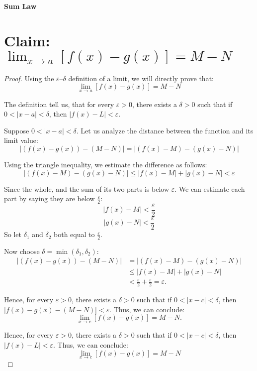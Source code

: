 \documentclass{article}
\begin{document}
	
\textbf{Sum Law}

\section*{Claim: $\lim_{x \to a} [f(x) - g(x)] = M - N$}


\begin{proof}

Using the $\varepsilon$–$\delta$ definition of a limit, we will directly prove that:
\[
\lim_{x \to a} [f(x) - g(x)] = M - N
\]

The definition tell us, that for every $\varepsilon > 0$, there exists a $\delta > 0$ such that if $0 < |x - a| < \delta$, then $|f(x) - L| < \varepsilon$.

Suppose $0 < |x - a| < \delta$. Let us analyze the distance between the function and its limit value:
\[
| (f(x) - g(x)) - (M - N) | = | (f(x) - M) - (g(x) - N) |
\]

Using the triangle inequality, we estimate the difference as follows:
\[
|(f(x) - M) - (g(x) - N)| \leq |f(x) - M| + |g(x) - N| < \varepsilon
\]


Since the whole, and the sum of its two parts is below $\varepsilon$. We can estimate each part by saying they are below $\frac{\varepsilon}{2}$:
\[
|f(x) - M| < \frac{\varepsilon}{2}
\]
\[
|g(x) - N| < \frac{\varepsilon}{2}
\]
So let $\delta_1$ and $\delta_2$ both equal to $\frac{\varepsilon}{2}$.


Now choose $\delta = \min(\delta_1, \delta_2)$:
\[
\begin{aligned}
| (f(x) - g(x)) - (M - N) | 
&= | (f(x) - M) - (g(x) - N) | \\
&\leq |f(x) - M| + |g(x) - N| \\
&< \frac{\varepsilon}{2} + \frac{\varepsilon}{2} = \varepsilon.
\end{aligned}
\]

Hence, for every $\varepsilon > 0$, there exists a $\delta > 0$ such that if $0 < |x - c| < \delta$, then $|f(x) - g(x) - (M - N)| < \varepsilon$. Thus, we can conclude:
\[
\lim_{x \to c} [f(x) - g(x)] = M - N.
\]













Hence, for every $\varepsilon > 0$, there exists a $\delta > 0$ such that if $0 < |x - c| < \delta$, then 
$|f(x) - L| < \varepsilon$. Thus, we can conclude:
\[
\lim_{x \to c} [f(x) - g(x)] = M - N
\]



\end{proof}
\end{document}

